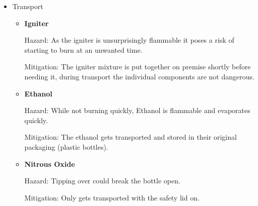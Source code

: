 \begin{itemize}
    \item Transport
    \begin{itemize}
        \item \textbf{Igniter}
        
        Hazard: As the igniter is unsurprisingly flammable it poses a risk of starting to burn at an unwanted time. 
        
        Mitigation: The igniter mixture is put together on premise shortly before needing it, during transport the individual components are not dangerous.
        
        \item \textbf{Ethanol}
        
        Hazard: While not burning quickly, Ethanol is flammable and evaporates quickly.
        
        Mitigation: The ethanol gets transported and stored in their original packaging (plastic bottles).
        
        \item \textbf{Nitrous Oxide}
        
        Hazard: Tipping over could break the bottle open.
        
        Mitigation: Only gets transported with the safety lid on.
    \end{itemize}
\end{itemize}

